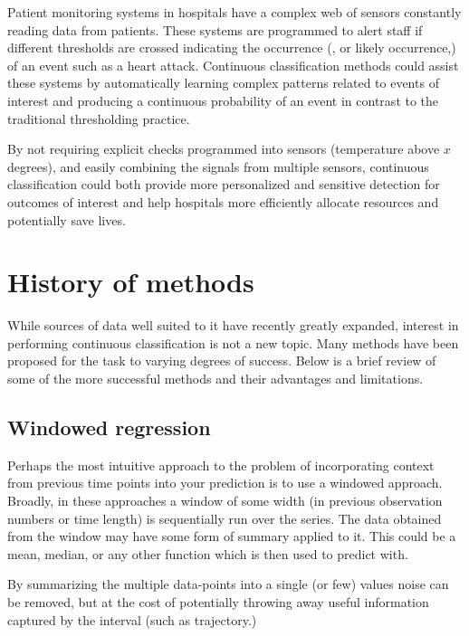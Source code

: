 \documentclass[]{book}
\theoremstyle{definition}
\theoremstyle{definition}
\theoremstyle{definition}
\theoremstyle{remark}
\begin{document}
Patient monitoring systems in hospitals have a complex web of sensors
constantly reading data from patients. These systems are programmed to
alert staff if different thresholds are crossed indicating the
occurrence (, or likely occurrence,) of an event such as a heart attack.
Continuous classification methods could assist these systems by
automatically learning complex patterns related to events of interest
and producing a continuous probability of an event in contrast to the
traditional thresholding practice.

By not requiring explicit checks programmed into sensors (temperature
above \(x\) degrees), and easily combining the signals from multiple
sensors, continuous classification could both provide more personalized
and sensitive detection for outcomes of interest and help hospitals more
efficiently allocate resources and potentially save lives.

\section{History of methods}\label{history-of-methods}

While sources of data well suited to it have recently greatly expanded,
interest in performing continuous classification is not a new topic.
Many methods have been proposed for the task to varying degrees of
success. Below is a brief review of some of the more successful methods
and their advantages and limitations.

\subsection{Windowed regression}\label{windowed-regression}

Perhaps the most intuitive approach to the problem of incorporating
context from previous time points into your prediction is to use a
windowed approach. Broadly, in these approaches a window of some width
(in previous observation numbers or time length) is sequentially run
over the series. The data obtained from the window may have some form of
summary applied to it. This could be a mean, median, or any other
function which is then used to predict with.

By summarizing the multiple data-points into a single (or few) values
noise can be removed, but at the cost of potentially throwing away
useful information captured by the interval (such as trajectory.)
\end{document}
